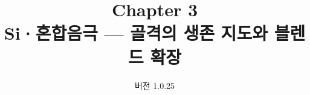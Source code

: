 


\renewcommand{\theequation}{3.\arabic{equation}}
\renewcommand{\thesection}{3.\arabic{section}}

\title{\textbf{\LARGE Chapter 3}\\[0.35em]\Large Si·혼합음극 --- 골격의 생존 지도와 블렌드 확장}
\author{}
\date{\normalsize 버전 1.0.25}


\maketitle







\appendix



